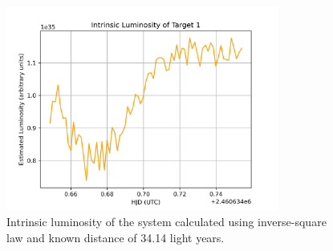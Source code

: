 \begin{figure}[h!]
        \centering
        \includegraphics[width=0.8\textwidth]{figs/luminosity_curve.png}
        \caption{Intrinsic luminosity of the system calculated using inverse-square law and known distance of 34.14 light years.}
        \label{fig:luminositycurve}
\end{figure}
